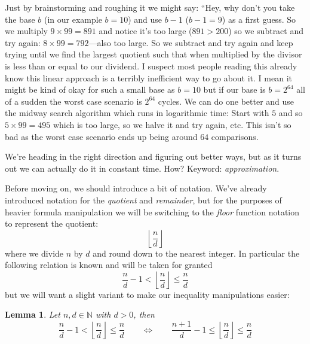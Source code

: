 \documentclass[twoside]{article}
\newtheorem{lemma}{Lemma}[section]
\begin{document}
Just by brainstorming and roughing it we might say: ``Hey, why don't you take the base $ b $ (in our example $ b=10 $) and use
$ b-1 $ ($ b-1=9 $) as a first guess. So we multiply $ 9\times 99=891 $ and notice it's too large ($ 891 > 200 $) so we subtract
and try again: $ 8\times 99=792 $---also too large. So we subtract and try again and keep trying until we find the largest quotient
such that when multiplied by the divisor is less than or equal to our dividend. I suspect most people reading this already know
this linear approach is a terribly inefficient way to go about it. I mean it might be kind of okay for such a small base as $ b=10 $
but if our base is $ b=2^{64} $ all of a sudden the worst case scenario is $ 2^{64} $ cycles. We can do one better and use the midway
search algorithm which runs in logarithmic time: Start with $ 5 $ and so $ 5\times 99=495 $ which is too large, so we halve it
and try again, etc. This isn't so bad as the worst case scenario ends up being around $ 64 $ comparisons.

We're heading in the right direction and figuring out better ways, but as it turns out we can actually do it in constant time.
How? Keyword: \emph{approximation}.

Before moving on, we should introduce a bit of notation. We've already introduced notation for the \emph{quotient}
and \emph{remainder}, but for the purposes of heavier formula manipulation we will be switching to the \emph{floor}
function notation to represent the quotient:
$$ \left\lfloor\frac{n}{d}\right\rfloor $$
where we divide $ n $ by $ d $ and round down to the nearest integer.
In particular the following relation is known and will be taken for granted
$$ \frac{n}{d}-1 < \left\lfloor\frac{n}{d}\right\rfloor\le\frac{n}{d} $$
but we will want a slight variant to make our inequality manipulations easier:
\begin{lemma}
Let $ n,d\in\mathbb{N} $ with $ d > 0 $, then
$$ \frac{n}{d}-1 < \left\lfloor\frac{n}{d}\right\rfloor\le\frac{n}{d}\qquad
	\Longleftrightarrow\qquad\frac{n+1}{d}-1 \le\left\lfloor\frac{n}{d}\right\rfloor\le\frac{n}{d} $$
\end{lemma}
\end{document}
